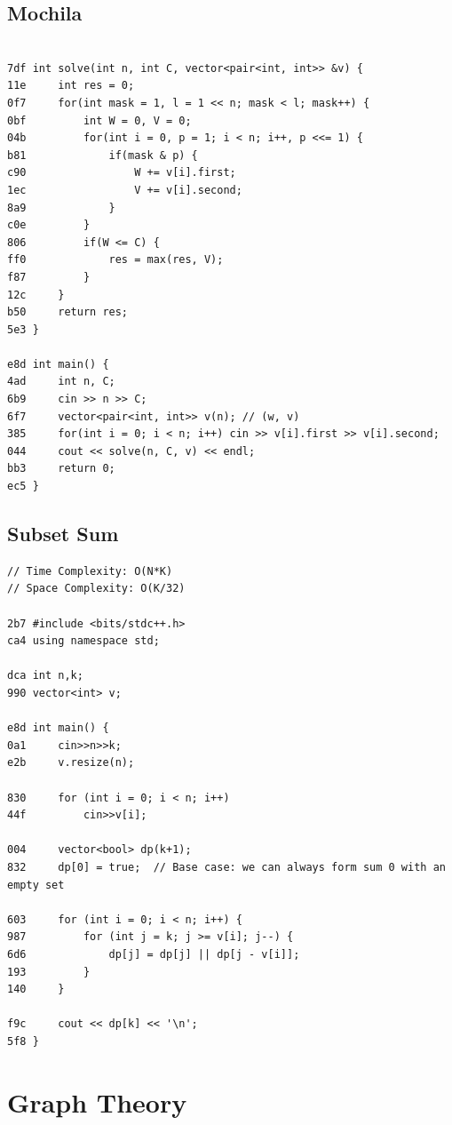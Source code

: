 \documentclass[11pt, a4paper, twoside]{article}
\begin{document}
\subsection{Mochila}
\begin{lstlisting}

7df int solve(int n, int C, vector<pair<int, int>> &v) {
11e 	int res = 0;
0f7 	for(int mask = 1, l = 1 << n; mask < l; mask++) {
0bf 		int W = 0, V = 0;
04b 		for(int i = 0, p = 1; i < n; i++, p <<= 1) {
b81 			if(mask & p) {
c90 				W += v[i].first;
1ec 				V += v[i].second;
8a9 			}
c0e 		}
806 		if(W <= C) {
ff0 			res = max(res, V);
f87 		}
12c 	}
b50 	return res;
5e3 }
 
e8d int main() {
4ad 	int n, C;
6b9 	cin >> n >> C;
6f7 	vector<pair<int, int>> v(n); // (w, v)
385 	for(int i = 0; i < n; i++) cin >> v[i].first >> v[i].second;
044 	cout << solve(n, C, v) << endl;
bb3 	return 0;
ec5 }
\end{lstlisting}

\subsection{Subset Sum}
\begin{lstlisting}
// Time Complexity: O(N*K)
// Space Complexity: O(K/32)

2b7 #include <bits/stdc++.h>
ca4 using namespace std;

dca int n,k;
990 vector<int> v;

e8d int main() {
0a1     cin>>n>>k;
e2b     v.resize(n);
    
830     for (int i = 0; i < n; i++)
44f         cin>>v[i];
    
004     vector<bool> dp(k+1);
832     dp[0] = true;  // Base case: we can always form sum 0 with an empty set
        
603     for (int i = 0; i < n; i++) {
987         for (int j = k; j >= v[i]; j--) {
6d6             dp[j] = dp[j] || dp[j - v[i]];
193         }
140     }
    
f9c     cout << dp[k] << '\n';
5f8 }
\end{lstlisting}



%
%

\section{Graph Theory}
\end{document}
